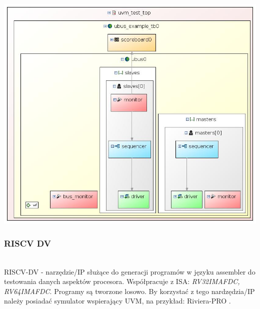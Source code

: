 \documentclass[11pt,a4paper]{article}
\begin{document}
					\begin{samepage}
				\nopagebreak
				\begin{center}
					\includegraphics[width=14cm]{./rysunki/uvm_graph.jpg}
				\end{center}
			\end{samepage}
		\subsubsection{RISCV DV}
		\hspace{5mm}
			\\RISCV-DV - narzędzie/IP służące do generacji programów w języku assembler do testowania danych aspektów procesora. Współpracuje z ISA: \textit{RV32IMAFDC, RV64IMAFDC}. Programy są tworzone losowo. By korzystać z tego nardzędzia/IP należy posiadać symulator wspierający UVM, na przykład: Riviera-PRO \cite{google_dv}.
\end{document}
